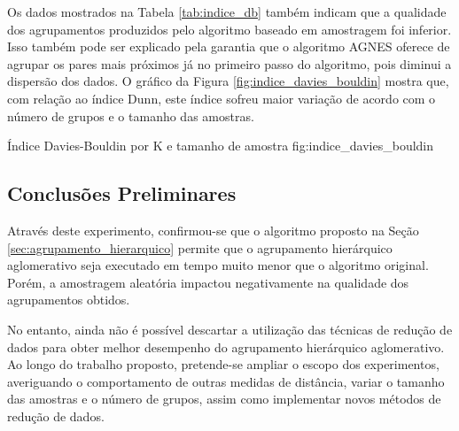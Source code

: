 

Os dados mostrados na Tabela \ref{tab:indice_db} também indicam que a qualidade
dos agrupamentos produzidos pelo algoritmo baseado em amostragem foi inferior.
Isso também pode ser explicado pela garantia que o algoritmo AGNES oferece 
de agrupar os pares mais próximos já no primeiro passo do algoritmo, pois 
diminui a dispersão dos dados. O gráfico da Figura
\ref{fig:indice_davies_bouldin} mostra que, com relação ao índice Dunn, este
índice sofreu maior variação de acordo com o número de grupos e o tamanho das
amostras. 

{Índice Davies-Bouldin por K e tamanho de amostra}
{fig:indice_davies_bouldin}

\subsection{Conclusões Preliminares}
	\label{subsec:conclusoes_preliminares}
	
Através deste experimento, confirmou-se que o algoritmo proposto na Seção
\ref{sec:agrupamento_hierarquico} permite que o agrupamento hierárquico
aglomerativo seja executado em tempo muito menor que o algoritmo original.
Porém, a amostragem aleatória impactou negativamente na qualidade dos
agrupamentos obtidos.

No entanto, ainda não é possível descartar a utilização das técnicas de redução
de dados para obter melhor desempenho do agrupamento hierárquico aglomerativo.
Ao longo do trabalho proposto, pretende-se ampliar o escopo dos experimentos,
averiguando o comportamento de outras medidas de distância, variar o tamanho
das amostras e o número de grupos, assim como implementar novos métodos de 
redução de dados. 